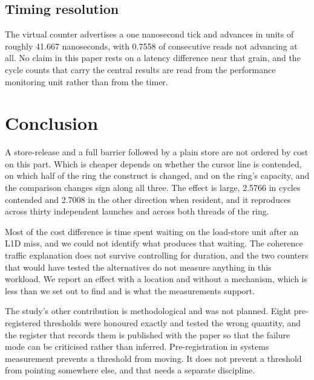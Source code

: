 \documentclass[conference]{IEEEtran}
\begin{document}
\subsection{Timing resolution}

The virtual counter advertises a one nanosecond tick and advances in units of
roughly 41.667 nanoseconds, with 0.7558 of consecutive reads not advancing at
all. No claim in this paper rests on a latency difference near that grain, and
the cycle counts that carry the central results are read from the performance
monitoring unit rather than from the timer.

\section{Conclusion}

A store-release and a full barrier followed by a plain store are not ordered by
cost on this part. Which is cheaper depends on whether the cursor line is
contended, on which half of the ring the construct is changed, and on the ring's
capacity, and the comparison changes sign along all three. The effect is large,
2.5766 in cycles contended and 2.7008 in the other direction when resident, and
it reproduces across thirty independent launches and across both threads of the
ring.

Most of the cost difference is time spent waiting on the load-store unit after
an L1D miss, and we could not identify what produces that waiting. The
coherence traffic explanation does not survive controlling for duration, and the
two counters that would have tested the alternatives do not measure anything in
this workload. We report an effect with a location and without a mechanism,
which is less than we set out to find and is what the measurements support.

The study's other contribution is methodological and was not planned. Eight
pre-registered thresholds were honoured exactly and tested the wrong quantity,
and the register that records them is published with the paper so that the
failure mode can be criticised rather than inferred. Pre-registration in
systems measurement prevents a threshold from moving. It does not prevent a
threshold from pointing somewhere else, and that needs a separate discipline.



\end{document}
